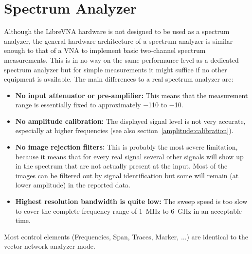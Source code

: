 \documentclass[a4paper,11pt]{article}
\newcommand{\vna}{LibreVNA}
\begin{document}
\section{Spectrum Analyzer}
Although the \vna{} hardware is not designed to be used as a spectrum analyzer, the general hardware architecture of a spectrum analyzer is similar enough to that of a VNA to implement basic two-channel spectrum measurements. This is in no way on the same performance level as a dedicated spectrum analyzer but for simple measurements it might suffice if no other equipment is available. The main differences to a real spectrum analyzer are:
\begin{itemize}
\item \textbf{No input attenuator or pre-amplifier:} This means that the measurement range is essentially fixed to approximately \SI{-110}{\dBm} to \SI{-10}{\dBm}.
\item \textbf{No amplitude calibration:} The displayed signal level is not very accurate, especially at higher frequencies (see also section~\ref{amplitude:calibration}).
\item \textbf{No image rejection filters:} This is probably the most severe limitation, because it means that for every real signal several other signals will show up in the spectrum that are not actually present at the input. Most of the images can be filtered out by signal identification but some will remain (at lower amplitude) in the reported data.
\item \textbf{Highest resolution bandwidth is quite low:} The sweep speed is too slow to cover the complete frequency range of \SI{1}{\mega\hertz} to \SI{6}{\giga\hertz} in an acceptable time.
\end{itemize}

Most control elements (Frequencies, Span, Traces, Marker, ...) are identical to the vector network analyzer mode.
\end{document}
